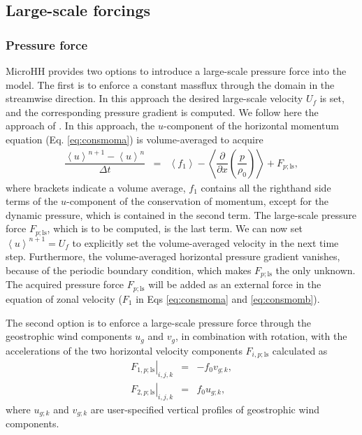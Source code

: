 \documentclass[gmd,manuscript]{copernicus}
\begin{document}
\subsection{Large-scale forcings}
\subsubsection{Pressure force}
MicroHH provides two options to introduce a large-scale pressure force into the model. The first is to enforce a constant massflux through the domain in the streamwise direction. In this approach the desired large-scale velocity $U_f$ is set, and the corresponding pressure gradient is computed. We follow here the approach of  \citet{vanReeuwijk2007}. In this approach, the $u$-component of the horizontal momentum equation (Eq. \ref{eq:consmoma}) is volume-averaged to acquire
\begin{eqnarray}
\dfrac{\left< u \right>^{n+1}  - \left< u \right>^{n}}{\Delta t} & = & \left< f_1 
\right> - \left< \dfrac{\partial}{\partial x} \left( \dfrac{p}{\rho_0} \right) \right>
+ F_{p;\textrm{ls}},
\end{eqnarray}
where brackets indicate a volume average, $f_1$ contains all the righthand side terms of the $u$-component of the conservation of momentum, except for the dynamic pressure, which is contained in the second term. The large-scale pressure force $F_{p;\textrm{ls}}$, which is to be computed, is the last term. We can now set $\left< u \right>^{n+1} = U_f$ to explicitly set the volume-averaged velocity in the next time step. Furthermore, the volume-averaged horizontal pressure gradient vanishes, because of the periodic boundary condition, which makes $F_{p;\textrm{ls}}$ the only unknown. The acquired pressure force $F_{p;\textrm{ls}}$ will be added as an external force in the equation of zonal velocity ($F_1$ in Eqs \ref{eq:consmoma} and \ref{eq:consmomb}).

The second option is to enforce a large-scale pressure force through the geostrophic wind components $u_g$ and $v_g$, in combination with rotation, with the accelerations of the two horizontal velocity components $F_{i,p;\textrm{ls}}$ calculated as
\begin{eqnarray}
\left. F_{1, p;\textrm{ls}} \right|_{i,j,k} & = & -f_0 v_{g;k},\\
\left. F_{2, p;\textrm{ls}} \right|_{i,j,k} & = &  f_0 u_{g;k},
\end{eqnarray}
where $u_{g;k}$ and $v_{g;k}$ are user-specified vertical profiles of geostrophic wind components.
\end{document}
